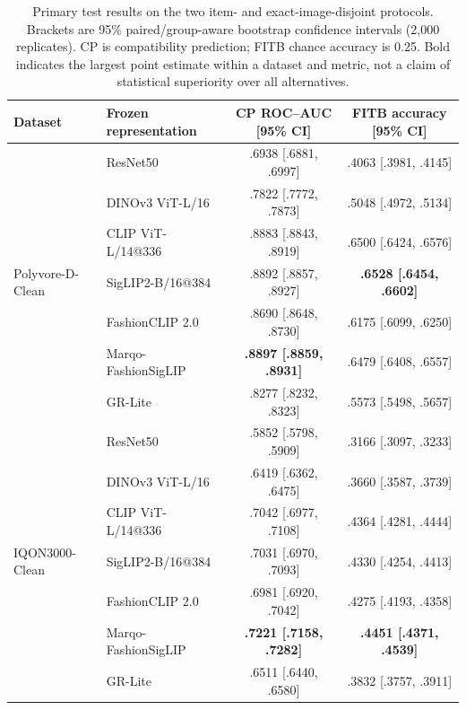 \begin{table}[t]
\caption{Primary test results on the two item- and exact-image-disjoint protocols. Brackets are 95\% paired/group-aware bootstrap confidence intervals (2,000 replicates). CP is compatibility prediction; FITB chance accuracy is 0.25. Bold indicates the largest point estimate within a dataset and metric, not a claim of statistical superiority over all alternatives.}
\label{tab:main}
\centering
\small
\setlength{\tabcolsep}{5pt}
\begin{tabular}{llcc}
\toprule
Dataset & Frozen representation & CP ROC--AUC [95\% CI] & FITB accuracy [95\% CI] \\
\midrule
\multirow{7}{*}{Polyvore-D-Clean}
 & ResNet50 & .6938 [.6881, .6997] & .4063 [.3981, .4145] \\
 & DINOv3 ViT-L/16 & .7822 [.7772, .7873] & .5048 [.4972, .5134] \\
 & CLIP ViT-L/14@336 & .8883 [.8843, .8919] & .6500 [.6424, .6576] \\
 & SigLIP2-B/16@384 & .8892 [.8857, .8927] & \textbf{.6528 [.6454, .6602]} \\
 & FashionCLIP 2.0 & .8690 [.8648, .8730] & .6175 [.6099, .6250] \\
 & Marqo-FashionSigLIP & \textbf{.8897 [.8859, .8931]} & .6479 [.6408, .6557] \\
 & GR-Lite & .8277 [.8232, .8323] & .5573 [.5498, .5657] \\
\midrule
\multirow{7}{*}{IQON3000-Clean}
 & ResNet50 & .5852 [.5798, .5909] & .3166 [.3097, .3233] \\
 & DINOv3 ViT-L/16 & .6419 [.6362, .6475] & .3660 [.3587, .3739] \\
 & CLIP ViT-L/14@336 & .7042 [.6977, .7108] & .4364 [.4281, .4444] \\
 & SigLIP2-B/16@384 & .7031 [.6970, .7093] & .4330 [.4254, .4413] \\
 & FashionCLIP 2.0 & .6981 [.6920, .7042] & .4275 [.4193, .4358] \\
 & Marqo-FashionSigLIP & \textbf{.7221 [.7158, .7282]} & \textbf{.4451 [.4371, .4539]} \\
 & GR-Lite & .6511 [.6440, .6580] & .3832 [.3757, .3911] \\
\bottomrule
\end{tabular}
\end{table}
